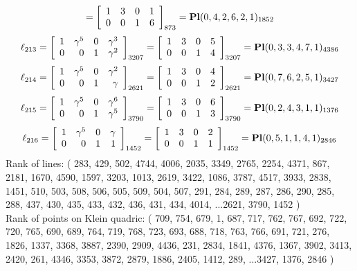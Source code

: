 \documentclass{article}
\begin{document}
{$$=
\left[
\begin{array}{*{4}c}
1  & 3  & 0  & 1\\
0  & 0  & 1  & 6\\
\end{array}
\right]_{873}
={\rm\bf Pl}(0,4,2,6,2,1 )_{1852}$$
$$
\ell_{213} = 
\left[
\begin{array}{*{4}{r}}
1 & \gamma^{5} & 0 & \gamma^{3}\\
0 & 0 & 1 & \gamma^{2}\\
\end{array}
\right]
_{3207}
=
\left[
\begin{array}{*{4}c}
1  & 3  & 0  & 5\\
0  & 0  & 1  & 4\\
\end{array}
\right]_{3207}
={\rm\bf Pl}(0,3,3,4,7,1 )_{4386}$$
$$
\ell_{214} = 
\left[
\begin{array}{*{4}{r}}
1 & \gamma^{5} & 0 & \gamma^{2}\\
0 & 0 & 1 & \gamma \\
\end{array}
\right]
_{2621}
=
\left[
\begin{array}{*{4}c}
1  & 3  & 0  & 4\\
0  & 0  & 1  & 2\\
\end{array}
\right]_{2621}
={\rm\bf Pl}(0,7,6,2,5,1 )_{3427}$$
$$
\ell_{215} = 
\left[
\begin{array}{*{4}{r}}
1 & \gamma^{5} & 0 & \gamma^{6}\\
0 & 0 & 1 & \gamma^{5}\\
\end{array}
\right]
_{3790}
=
\left[
\begin{array}{*{4}c}
1  & 3  & 0  & 6\\
0  & 0  & 1  & 3\\
\end{array}
\right]_{3790}
={\rm\bf Pl}(0,2,4,3,1,1 )_{1376}$$
$$
\ell_{216} = 
\left[
\begin{array}{*{4}{r}}
1 & \gamma^{5} & 0 & \gamma \\
0 & 0 & 1 & 1\\
\end{array}
\right]
_{1452}
=
\left[
\begin{array}{*{4}c}
1  & 3  & 0  & 2\\
0  & 0  & 1  & 1\\
\end{array}
\right]_{1452}
={\rm\bf Pl}(0,5,1,1,4,1 )_{2846}$$
Rank of lines: ( 283, 429, 502, 4744, 4006, 2035, 3349, 2765, 2254, 4371, 867, 2181, 1670, 4590, 1597, 3203, 1013, 2619, 3422, 1086, 3787, 4517, 3933, 2838, 1451, 510, 503, 508, 506, 505, 509, 504, 507, 291, 284, 289, 287, 286, 290, 285, 288, 437, 430, 435, 433, 432, 436, 431, 434, 4014, ...2621, 3790, 1452 )\\
Rank of points on Klein quadric: ( 709, 754, 679, 1, 687, 717, 762, 767, 692, 722, 720, 765, 690, 689, 764, 719, 768, 723, 693, 688, 718, 763, 766, 691, 721, 276, 1826, 1337, 3368, 3887, 2390, 2909, 4436, 231, 2834, 1841, 4376, 1367, 3902, 3413, 2420, 261, 4346, 3353, 3872, 2879, 1886, 2405, 1412, 289, ...3427, 1376, 2846 )\\
}
\end{document}
